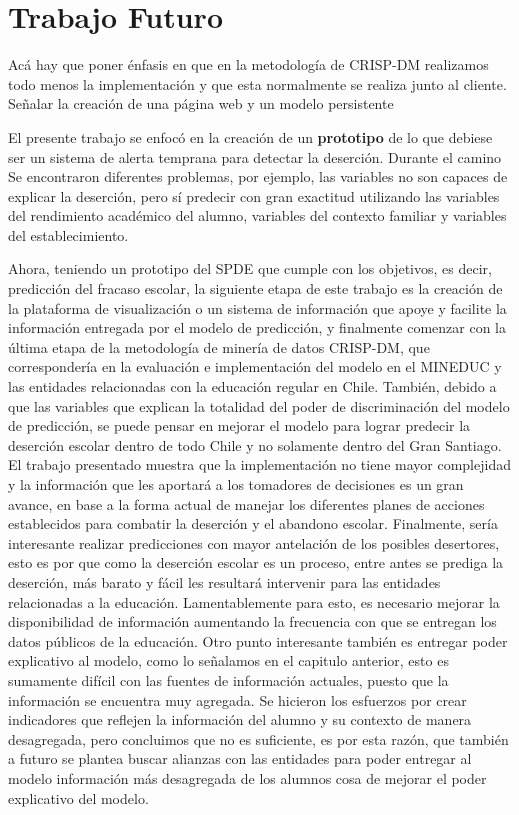 \chapter{Trabajo Futuro}
\label{ch:trafu}
Acá hay que poner énfasis en que en la metodología de CRISP-DM realizamos todo menos la implementación y que esta normalmente se realiza junto al cliente. Señalar la creación de una página web y un modelo persistente 

El presente trabajo se enfocó en la creación de un \textbf{prototipo} de lo que debiese ser un sistema de alerta temprana para detectar la deserción. Durante el camino Se encontraron diferentes problemas, por ejemplo, las variables no son capaces de explicar la deserción, pero sí predecir con gran exactitud utilizando las variables del rendimiento académico del alumno, variables del contexto familiar y variables del establecimiento.

Ahora, teniendo un prototipo del SPDE que cumple con los objetivos, es decir, predicción del fracaso escolar, la siguiente etapa de este trabajo es la creación de la plataforma de visualización o un sistema de información que apoye y facilite la información entregada por el modelo de predicción, y finalmente comenzar con la última etapa de la metodología de minería de datos CRISP-DM, que correspondería en la evaluación e implementación del modelo en el MINEDUC y las entidades relacionadas con la educación regular en Chile. También, debido a que las variables que explican la totalidad del poder de discriminación del modelo de predicción, se puede pensar en mejorar el modelo para lograr predecir la deserción escolar dentro de todo Chile y no solamente dentro del Gran Santiago. El trabajo presentado muestra que la implementación no tiene mayor complejidad y la información que les aportará a los tomadores de decisiones es un gran avance, en base a la forma actual de manejar los diferentes planes de acciones establecidos para combatir la deserción y el abandono escolar.
Finalmente, sería interesante realizar predicciones con mayor antelación de los posibles desertores, esto es por que como la deserción escolar es un proceso, entre antes se prediga la deserción, más barato y fácil les resultará intervenir para las entidades relacionadas a la educación. Lamentablemente para esto, es necesario mejorar la disponibilidad de información aumentando la frecuencia con que se entregan los datos públicos de la educación. Otro punto interesante también es entregar poder explicativo al modelo, como lo señalamos en el capitulo anterior, esto es sumamente difícil con las fuentes de información actuales, puesto que la información se encuentra muy agregada. Se hicieron los esfuerzos por crear indicadores que reflejen la información del alumno y su contexto de manera desagregada, pero concluimos que no es suficiente, es por esta razón, que también a futuro se plantea buscar alianzas con las entidades para poder entregar al modelo información más desagregada de los alumnos cosa de mejorar el poder explicativo del modelo.